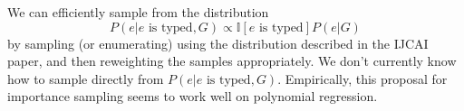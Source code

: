\documentclass[12pt]{article}
\begin{document}
We can efficiently sample from the distribution
$$P(e | e\mbox{ is typed}, G)\propto \mathbb{I}[e\mbox{ is typed}] P(e | G)$$
by sampling (or enumerating) using the distribution described in the IJCAI paper, and then reweighting the samples appropriately.
We don't currently know how to sample directly from $P(e | e\mbox{ is typed}, G)$.
Empirically, this proposal for importance sampling seems to work well on polynomial regression.
\end{document}
